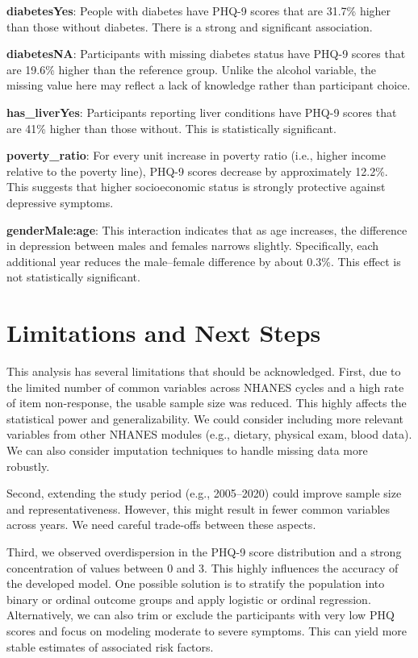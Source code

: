 \documentclass[
  11pt,
]{article}
\begin{document}
\textbf{diabetesYes}: People with diabetes have PHQ-9 scores that are 31.7\% higher than those without diabetes. There is a strong and significant association.

\textbf{diabetesNA}: Participants with missing diabetes status have PHQ-9 scores that are 19.6\% higher than the reference group. Unlike the alcohol variable, the missing value here may reflect a lack of knowledge rather than participant choice.

\textbf{has\_liverYes}: Participants reporting liver conditions have PHQ-9 scores that are 41\% higher than those without. This is statistically significant.

\textbf{poverty\_ratio}: For every unit increase in poverty ratio (i.e., higher income relative to the poverty line), PHQ-9 scores decrease by approximately 12.2\%. This suggests that higher socioeconomic status is strongly protective against depressive symptoms.

\textbf{genderMale:age}: This interaction indicates that as age increases, the difference in depression between males and females narrows slightly. Specifically, each additional year reduces the male--female difference by about 0.3\%. This effect is not statistically significant.

\section{Limitations and Next Steps}\label{limitations-and-next-steps}

This analysis has several limitations that should be acknowledged. First, due to the limited number of common variables across NHANES cycles and a high rate of item non-response, the usable sample size was reduced. This highly affects the statistical power and generalizability. We could consider including more relevant variables from other NHANES modules (e.g., dietary, physical exam, blood data). We can also consider imputation techniques to handle missing data more robustly.

Second, extending the study period (e.g., 2005--2020) could improve sample size and representativeness. However, this might result in fewer common variables across years. We need careful trade-offs between these aspects.

Third, we observed overdispersion in the PHQ-9 score distribution and a strong concentration of values between 0 and 3. This highly influences the accuracy of the developed model. One possible solution is to stratify the population into binary or ordinal outcome groups and apply logistic or ordinal regression. Alternatively, we can also trim or exclude the participants with very low PHQ scores and focus on modeling moderate to severe symptoms. This can yield more stable estimates of associated risk factors.
\end{document}
